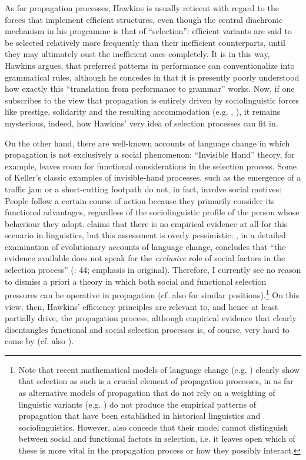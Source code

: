 \documentclass[output=paper]{langsci/langscibook}
\begin{document}
As for propagation processes, Hawkins is usually reticent with regard to the forces that implement efficient structures, even though the central diachronic mechanism in his programme is that of “selection”: efficient variants are said to be selected relatively more frequently than their inefficient counterparts, until they may ultimately oust the inefficient ones completely. It is in this way, Hawkins argues, that preferred patterns in performance can conventionalize into grammatical rules, although he concedes in \citet[10]{Hawkins2014} that it is presently poorly understood how exactly this “translation from performance to grammar” works. Now, if one subscribes to the view that propagation is entirely driven by sociolinguistic forces like prestige, solidarity and the resulting accommodation (e.g. \citealt{Croft2000,Cristofaro2017}, \citealt{Cristofaro2019tv}), it remains mysterious, indeed, how Hawkins’ very idea of selection processes can fit in. 

On the other hand, there are well-known accounts of language change in which propagation is not exclusively a social phenomenon:  “Invisible Hand” theory, for example, leaves room for functional considerations in the selection process. Some of Keller’s classic examples of invisible-hand processes, such as the emergence of a traffic jam or a short-cutting footpath do not, in fact, involve social motives: People follow a certain course of action because they primarily consider its functional advantages, regardless of the sociolinguistic profile of the person whose behaviour they adopt. \citet{Cristofaro2017} claims that there is no empirical evidence at all for this scenario in linguistics, but this assessment is overly pessimistic: \citet{Rosenbach2008}, in a detailed examination of evolutionary accounts of language change, concludes that “the evidence available does not speak for the \textit{exclusive} role of social factors in the selection process” (\citealt{Rosenbach2008}: 44; emphasis in original). Therefore, I currently see no reason to dismiss a priori a theory in which both social and functional selection pressures can be operative in propagation (cf. also \citealt{Haspelmath1999,Nettle1999,Enfield2014} for similar positions).\footnote{Note that recent mathematical models of language change (e.g. \citealt{BlytheCroft2012}) clearly show that selection as such is a crucial element of propagation processes, in as far as alternative models of propagation that do not rely on a weighting of linguistic variants (e.g. \citealt{Trudgill2004}) do not produce the empirical patterns of propagation that have been established in historical linguistics and sociolinguistics. However, \citet{BlytheCroft2012} also concede that their model cannot distinguish between social and functional factors in selection, i.e. it leaves open which of these is more vital in the propagation process or how they possibly interact.} On this view, then, Hawkins’ efficiency principles are relevant to, and hence at least partially drive, the propagation process, although empirical evidence that clearly disentangles functional and social selection processes is, of course, very hard to come by (cf. also \citealt{Seiler2006}). 
\end{document}

